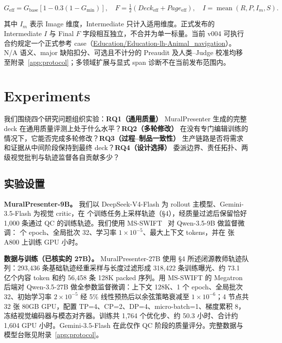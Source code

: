 \[
G_{\mathrm{eff}}=G_{\mathrm{base}}[1-0.3(1-G_{\min})],\quad
F=\tfrac12(Deck_{\mathrm{eff}}+Page_{\mathrm{eff}}),\quad
I=\operatorname{mean}(R,P,I_m,S).
\]

其中 \(I_m\) 表示 Image 维度，Intermediate 只计入适用维度。正式发布的 Intermediate \(I\) 与 Final \(F\) 字段相互独立，不合并为单一标量。当前 v004 可执行合约规定一个正式参考 case（\url{Education/Education-lh-Animal_navigation}）。N/A 语义、major 缺陷扣分、可选且不计分的 Preaudit 及人类–Judge 校准均移至附录~\ref{app:protocol}；多领域扩展与显式 span 诊断不在当前发布范围内。

\section{Experiments}

我们围绕四个研究问题组织实验：\textbf{RQ1（通用质量）} MuralPresenter 生成的完整 deck 在通用质量评测上处于什么水平？\textbf{RQ2（多轮修改）} 在没有专门编辑训练的情况下，它能否完成多轮修改？\textbf{RQ3（过程–制品一致性）} 生产链路是否将需求和证据从中间阶段保持到最终 deck？\textbf{RQ4（设计选择）} 委派边界、责任拓扑、两级视觉批判与轨迹监督各自贡献多少？

\subsection{实验设置}

\textbf{MuralPresenter-9B。} 我们以 DeepSeek-V4-Flash 为 rollout 主模型、Gemini-3.5-Flash 为视觉 critic，在  个训练任务上采样轨迹（§4），经质量过滤后保留恰好 1,000 条通过 QC 的训练轨迹。我们使用 MS-SWIFT~\citep{zhao2024mswift} 对 Qwen-3.5-9B 做监督微调： 个 epoch、全局批次 32、学习率 \(1\times10^{-5}\)、最大上下文  tokens，并在  张 A800 上训练  GPU 小时。

\textbf{数据与训练（已核实的 27B）。} MuralPresenter-27B 使用 §4 所述闭源教师轨迹队列：293{,}436 条基础轨迹经重采样与长度过滤形成 318{,}422 条训练曝光、约 73.1 亿个内容 token 和约 56{,}458 条 128K packed 序列。用 MS-SWIFT 的 Megatron 后端对 Qwen-3.5-27B 做全参数监督微调：上下文 128K、1 个 epoch、全局批次 32、初始学习率 \(2\times10^{-5}\) 经 5\% 线性预热后以余弦策略衰减至 \(1\times10^{-6}\)；4 节点共 32 张 80GB GPU，配置 TP=4、CP=2、DP=4、micro-batch=1、梯度累积 8，冻结视觉编码器与模态对齐器。训练共 1{,}764 个优化步、约 50.3 小时、合计约 1{,}604 GPU 小时。Gemini-3.5-Flash 在此仅作 QC 阶段的质量评分。完整数据与模型台账见附录~\ref{app:protocol}。

